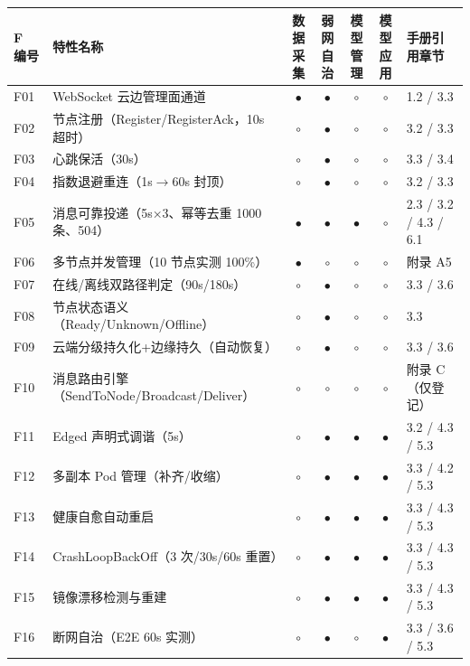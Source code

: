 {\setlength{\tabcolsep}{3pt}
\begin{longtable}{p{1.0cm}p{4.6cm}ccccp{3.2cm}}
\toprule
F 编号 & 特性名称 & \makecell{数据\\采集} & \makecell{弱网\\自治} & \makecell{模型\\管理} & \makecell{模型\\应用} & 手册引用章节\\
\midrule
\endhead
\bottomrule
\endfoot
F01 & WebSocket 云边管理面通道 & $\bullet$ & $\bullet$ & $\circ$ & $\circ$ & 1.2 / 3.3\\
F02 & 节点注册（Register/RegisterAck，10s 超时） & $\circ$ & $\bullet$ & $\circ$ & $\circ$ & 3.2 / 3.3\\
F03 & 心跳保活（30s） & $\circ$ & $\bullet$ & $\circ$ & $\circ$ & 3.3 / 3.4\\
F04 & 指数退避重连（1s$\rightarrow$60s 封顶） & $\circ$ & $\bullet$ & $\circ$ & $\circ$ & 3.2 / 3.3\\
F05 & 消息可靠投递（5s×3、幂等去重 1000 条、504） & $\bullet$ & $\bullet$ & $\bullet$ & $\circ$ & 2.3 / 3.2 / 4.3 / 6.1\\
F06 & 多节点并发管理（10 节点实测 100\%） & $\bullet$ & $\circ$ & $\circ$ & $\circ$ & 附录 A5\\
F07 & 在线/离线双路径判定（90s/180s） & $\circ$ & $\bullet$ & $\circ$ & $\circ$ & 3.3 / 3.6\\
F08 & 节点状态语义（Ready/Unknown/Offline） & $\circ$ & $\bullet$ & $\circ$ & $\circ$ & 3.3\\
F09 & 云端分级持久化+边缘持久（自动恢复） & $\circ$ & $\bullet$ & $\circ$ & $\circ$ & 3.3 / 3.6\\
F10 & 消息路由引擎（SendToNode/Broadcast/Deliver） & $\circ$ & $\circ$ & $\circ$ & $\circ$ & 附录 C（仅登记）\\
F11 & Edged 声明式调谐（5s） & $\circ$ & $\bullet$ & $\bullet$ & $\bullet$ & 3.2 / 4.3 / 5.3\\
F12 & 多副本 Pod 管理（补齐/收缩） & $\circ$ & $\bullet$ & $\bullet$ & $\bullet$ & 3.3 / 4.2 / 5.3\\
F13 & 健康自愈自动重启 & $\circ$ & $\bullet$ & $\bullet$ & $\bullet$ & 3.3 / 4.3 / 5.3\\
F14 & CrashLoopBackOff（3 次/30s/60s 重置） & $\circ$ & $\bullet$ & $\bullet$ & $\bullet$ & 3.3 / 4.3 / 5.3\\
F15 & 镜像漂移检测与重建 & $\circ$ & $\bullet$ & $\bullet$ & $\bullet$ & 3.3 / 4.3 / 5.3\\
F16 & 断网自治（E2E 60s 实测） & $\circ$ & $\bullet$ & $\circ$ & $\bullet$ & 3.3 / 3.6 / 5.3\\

\end{longtable}}
